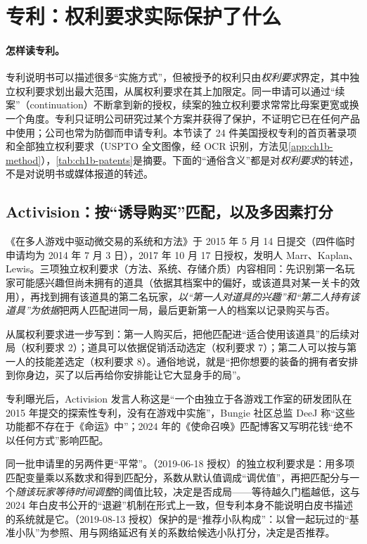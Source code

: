 \section{专利：权利要求实际保护了什么}
\label{sec:ch1b-patents}

\paragraph{怎样读专利。}
专利说明书可以描述很多“实施方式”，但被授予的权利只由\emph{权利要求}界定，其中独立权利要求划出最大范围，从属权利要求在其上加限定。同一申请可以通过“续案”（continuation）不断拿到新的授权，续案的独立权利要求常常比母案更宽或换一个角度。专利只证明公司研究过某个方案并获得了保护，不证明它已在任何产品中使用；公司也常为防御而申请专利。本节读了 24 件美国授权专利的首页著录项和全部独立权利要求（USPTO 全文图像，经 OCR 识别，方法见\cref{app:ch1b-method}），\cref{tab:ch1b-patents}是摘要。下面的“通俗含义”都是对\emph{权利要求}的转述，不是对说明书或媒体报道的转述。

\subsection{Activision：按“诱导购买”匹配，以及多因素打分}

《在多人游戏中驱动微交易的系统和方法》于 2015 年 5 月 14 日提交（四件临时申请均为 2014 年 7 月 3 日），2017 年 10 月 17 日授权，发明人 Marr、Kaplan、Lewis\cite{marr2017system}\tagPat。三项独立权利要求（方法、系统、存储介质）内容相同：先识别第一名玩家可能感兴趣但尚未拥有的道具（依据其档案中的偏好，或该道具对某一关卡的效用），再找到拥有该道具的第二名玩家，\emph{以“第一人对道具的兴趣”和“第二人持有该道具”为依据}把两人匹配进同一局，最后更新第一人的档案以记录购买与否\tagPat。

从属权利要求进一步写到：第一人购买后，把他匹配进“适合使用该道具”的后续对局（权利要求 2）；道具可以依据促销活动选定（权利要求 7）；第二人可以按与第一人的技能差选定（权利要求 8）\tagPat。通俗地说，就是“把你想要的装备的拥有者安排到你身边，买了以后再给你安排能让它大显身手的局”。

专利曝光后，Activision 发言人称这是“一个由独立于各游戏工作室的研发团队在 2015 年提交的探索性专利，没有在游戏中实施”，Bungie 社区总监 DeeJ 称“这些功能都不存在于《命运》中”\cite{gwaltney2017activision}\tagOff；2024 年的《使命召唤》匹配博客又写明花钱“绝不以任何方式”影响匹配\cite{activision2024blog}\tagOff。

同一批申请里的另两件更“平常”。（2019-06-18 授权）的独立权利要求是：用多项匹配变量乘以系数求和得到匹配分，系数从默认值调成“调优值”，再把匹配分与一个\emph{随该玩家等待时间调整}的阈值比较，决定是否成局\cite{marr2019matchmaking}\tagPat——等待越久门槛越低，这与 2024 年白皮书公开的“退避”机制在形式上一致，但专利本身不能说明白皮书描述的系统就是它。（2019-08-13 授权）保护的是“推荐小队构成”：以曾一起玩过的“基准小队”为参照、用与网络延迟有关的系数给候选小队打分，决定是否推荐\cite{marr2019group}\tagPat。

